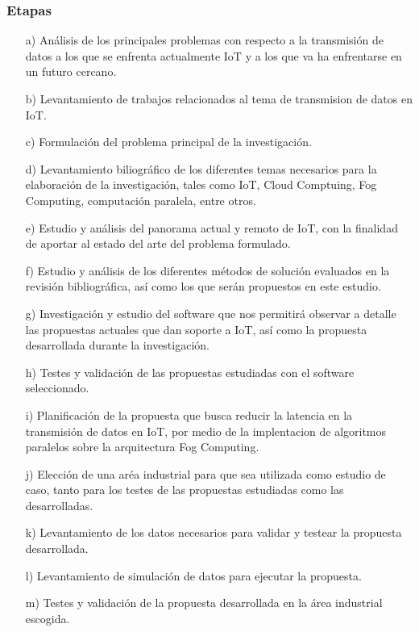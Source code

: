             \subsubsection{Etapas}
                \begin{enumerate}
                    \item[a)] Análisis de los principales problemas con respecto a la transmisión de datos a los que se enfrenta actualmente IoT y a los que va ha enfrentarse en un futuro cercano.
                    \item[b)] Levantamiento de trabajos relacionados al tema de transmision de datos en IoT.
                    \item[c)] Formulación del problema principal de la investigación.
                    \item[d)] Levantamiento biliográfico de los diferentes temas necesarios para la elaboración de la investigación, tales como IoT, Cloud Comptuing, Fog Computing, computación paralela, entre otros.
                    \item[e)] Estudio y análisis del panorama actual y remoto de IoT, con la finalidad de aportar al estado del arte del problema formulado.
                    \item[f)] Estudio y análisis de los diferentes métodos de solución evaluados en la revisión bibliográfica, así como los que serán propuestos en este estudio.
                    \item[g)] Investigación y estudio del software que nos permitirá observar a detalle las propuestas actuales que dan soporte a IoT, así como la propuesta desarrollada durante la investigación.
                    \item[h)] Testes y validación de las propuestas estudiadas con el software seleccionado. 
                    \item[i)] Planificación de la propuesta que busca reducir la latencia en la transmisión de datos en IoT, por medio de la implentacion de algoritmos paralelos sobre la arquitectura Fog Computing.
                    \item[j)] Elección de una aréa industrial para que sea utilizada como estudio de caso, tanto para los testes de las propuestas estudiadas como las desarrolladas.
                    \item[k)] Levantamiento de los datos necesarios para validar y testear la propuesta desarrollada.
                    \item[l)] Levantamiento de simulación de datos para ejecutar la propuesta.
                    \item[m)] Testes y validación de la propuesta desarrollada en la área industrial escogida. 
                \end{enumerate}                


